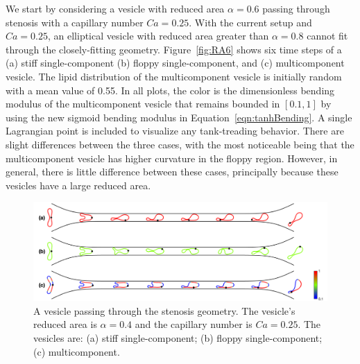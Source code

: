 \documentclass[twoside,twocolumn,9pt]{article}
\begin{document}
We start by considering a vesicle with reduced area $\alpha = 0.6$
passing through stenosis with a capillary number $Ca = 0.25$.  With the
current setup and $Ca=0.25$, an elliptical vesicle with reduced area
greater than $\alpha = 0.8$ cannot fit through the closely-fitting
geometry. Figure~\ref{fig:RA6} shows six time steps of a (a) stiff
single-component (b) floppy single-component, and (c) multicomponent
vesicle. The lipid distribution of the multicomponent vesicle is
initially random with a mean value of 0.55. In all plots, the color is
the dimensionless bending modulus of the multicomponent vesicle that
remains bounded in $[0.1,1]$ by using the new sigmoid bending modulus in
Equation~\eqref{eqn:tanhBending}. A single Lagrangian point is included
to visualize any tank-treading behavior. There are slight differences
between the three cases, with the most noticeable being that the
multicomponent vesicle has higher curvature in the floppy region.
However, in general, there is little difference between these cases,
principally because these vesicles have a large reduced area. 

\begin{figure}[h]
  \centering
  \includegraphics[width=0.9\linewidth]{figures/STENOSIS_RAp4MCp5.pdf}
  \caption{\label{fig:RA4} \small A vesicle passing through the stenosis
  geometry. The vesicle's reduced area is $\alpha = 0.4$ and the
  capillary number is $Ca = 0.25$. The vesicles are: (a) stiff
  single-component; (b) floppy single-component; (c) multicomponent.}
\end{figure}
\end{document}
